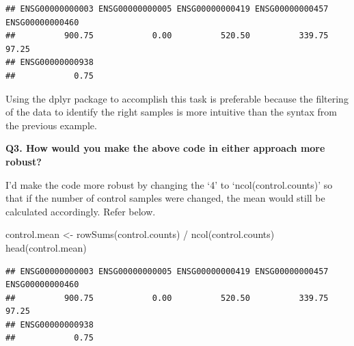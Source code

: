 \documentclass[
]{article}
\newenvironment{Shaded}{\begin{snugshade}}{\end{snugshade}}
\newcommand{\DecValTok}[1]{\textcolor[rgb]{0.00,0.00,0.81}{#1}}
\newcommand{\FunctionTok}[1]{\textcolor[rgb]{0.00,0.00,0.00}{#1}}
\newcommand{\NormalTok}[1]{#1}
\newcommand{\OtherTok}[1]{\textcolor[rgb]{0.56,0.35,0.01}{#1}}
\newcommand{\SpecialCharTok}[1]{\textcolor[rgb]{0.00,0.00,0.00}{#1}}
\newcommand{\StringTok}[1]{\textcolor[rgb]{0.31,0.60,0.02}{#1}}
\begin{document}
\begin{Shaded}
\end{Shaded}

\begin{verbatim}
## ENSG00000000003 ENSG00000000005 ENSG00000000419 ENSG00000000457 ENSG00000000460 
##          900.75            0.00          520.50          339.75           97.25 
## ENSG00000000938 
##            0.75
\end{verbatim}

Using the dplyr package to accomplish this task is preferable because
the filtering of the data to identify the right samples is more
intuitive than the syntax from the previous example.

\textbf{Q3. How would you make the above code in either approach more
robust?}

I'd make the code more robust by changing the `4' to
`ncol(control.counts)' so that if the number of control samples were
changed, the mean would still be calculated accordingly. Refer below.

\begin{Shaded}
\begin{Highlighting}[]
\NormalTok{control.mean }\OtherTok{\textless{}{-}} \FunctionTok{rowSums}\NormalTok{(control.counts) }\SpecialCharTok{/} \FunctionTok{ncol}\NormalTok{(control.counts)}
\FunctionTok{head}\NormalTok{(control.mean)}
\end{Highlighting}
\end{Shaded}

\begin{verbatim}
## ENSG00000000003 ENSG00000000005 ENSG00000000419 ENSG00000000457 ENSG00000000460 
##          900.75            0.00          520.50          339.75           97.25 
## ENSG00000000938 
##            0.75
\end{verbatim}
\end{document}
